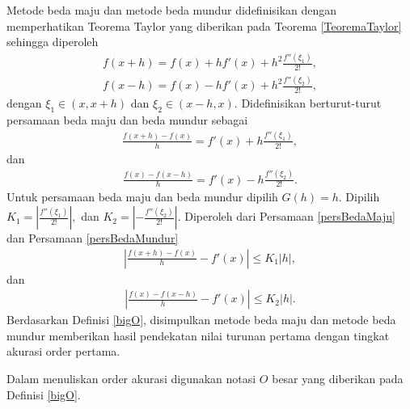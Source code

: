 Metode beda maju dan metode beda mundur didefinisikan dengan memperhatikan Teorema Taylor yang diberikan pada Teorema \ref{TeoremaTaylor} sehingga diperoleh
\begin{align*}
    f(x+h) = f(x) + hf'(x) + h^2\frac{f''(\xi_1)}{2!},\\
    f(x-h) = f(x) - hf'(x) + h^2\frac{f''(\xi_2)}{2!},
\end{align*}
dengan $\xi_1 \in (x,x+h)$ dan $\xi_2 \in (x-h, x)$.
Didefinisikan berturut-turut persamaan beda maju dan beda mundur sebagai
\begin{align}\label{persBedaMaju}
    \frac{f(x+h) - f(x)}{h} = f'(x) + h\frac{f''(\xi_1)}{2!} ,
\end{align}
dan
\begin{align}\label{persBedaMundur}
    \frac{f(x) - f(x-h)}{h} = f'(x) - h\frac{f''(\xi_2)}{2!}.
\end{align}
Untuk persamaan beda maju dan beda mundur dipilih $G(h) = h$. Dipilih $K_1 = \left|\frac{f''(\xi_1)}{2!}\right|,$ dan $K_2 = \left|-\frac{f''(\xi_2)}{2!}\right|$.
Diperoleh dari Persamaan \eqref{persBedaMaju} dan Persamaan \eqref{persBedaMundur} 
\begin{align*}
    \left| \frac{f(x+h) - f(x)}{h} - f'(x) \right| \leq K_1|h|,
\end{align*}
dan
\begin{align*}
    \left| \frac{f(x) - f(x-h)}{h} - f'(x) \right| \leq K_2|h|.
\end{align*}
Berdasarkan Definisi \ref{bigO}, disimpulkan metode beda maju dan metode beda mundur memberikan hasil pendekatan nilai turunan pertama dengan tingkat akurasi order pertama.

Dalam menuliskan order akurasi digunakan notasi $O$ besar yang diberikan pada Definisi \ref{bigO}.

